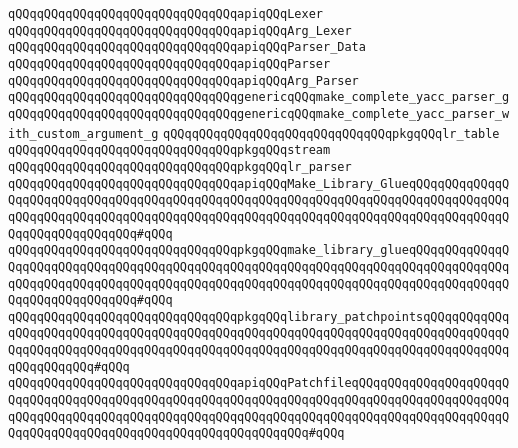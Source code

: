 \verb|qQQqqQQqqQQqqQQqqQQqqQQqqQQqqQQqapiqQQqLexer|\newline
\verb|qQQqqQQqqQQqqQQqqQQqqQQqqQQqqQQqapiqQQqArg_Lexer|\newline
\verb|qQQqqQQqqQQqqQQqqQQqqQQqqQQqqQQqapiqQQqParser_Data|\newline
\verb|qQQqqQQqqQQqqQQqqQQqqQQqqQQqqQQqapiqQQqParser|\newline
\verb|qQQqqQQqqQQqqQQqqQQqqQQqqQQqqQQqapiqQQqArg_Parser|\newline
\newline
\verb|qQQqqQQqqQQqqQQqqQQqqQQqqQQqqQQqgenericqQQqmake_complete_yacc_parser_g|\newline
\verb|qQQqqQQqqQQqqQQqqQQqqQQqqQQqqQQqgenericqQQqmake_complete_yacc_parser_with_custom_argument_g|\newline
\newline
\verb|qQQqqQQqqQQqqQQqqQQqqQQqqQQqqQQqpkgqQQqlr_table|\newline
\verb|qQQqqQQqqQQqqQQqqQQqqQQqqQQqqQQqpkgqQQqstream|\newline
\verb|qQQqqQQqqQQqqQQqqQQqqQQqqQQqqQQqpkgqQQqlr_parser|\newline
\newline
\verb|qQQqqQQqqQQqqQQqqQQqqQQqqQQqqQQqapiqQQqMake_Library_GlueqQQqqQQqqQQqqQQqqQQqqQQqqQQqqQQqqQQqqQQqqQQqqQQqqQQqqQQqqQQqqQQqqQQqqQQqqQQqqQQqqQQqqQQqqQQqqQQqqQQqqQQqqQQqqQQqqQQqqQQqqQQqqQQqqQQqqQQqqQQqqQQqqQQqqQQqqQQqqQQqqQQqqQQqqQQq#qQQq|\newline
\verb|qQQqqQQqqQQqqQQqqQQqqQQqqQQqqQQqpkgqQQqmake_library_glueqQQqqQQqqQQqqQQqqQQqqQQqqQQqqQQqqQQqqQQqqQQqqQQqqQQqqQQqqQQqqQQqqQQqqQQqqQQqqQQqqQQqqQQqqQQqqQQqqQQqqQQqqQQqqQQqqQQqqQQqqQQqqQQqqQQqqQQqqQQqqQQqqQQqqQQqqQQqqQQqqQQqqQQqqQQq#qQQq|\newline
\newline
\verb|qQQqqQQqqQQqqQQqqQQqqQQqqQQqqQQqpkgqQQqlibrary_patchpointsqQQqqQQqqQQqqQQqqQQqqQQqqQQqqQQqqQQqqQQqqQQqqQQqqQQqqQQqqQQqqQQqqQQqqQQqqQQqqQQqqQQqqQQqqQQqqQQqqQQqqQQqqQQqqQQqqQQqqQQqqQQqqQQqqQQqqQQqqQQqqQQqqQQqqQQqqQQqqQQqqQQq#qQQq|\newline
\newline
\verb|qQQqqQQqqQQqqQQqqQQqqQQqqQQqqQQqapiqQQqPatchfileqQQqqQQqqQQqqQQqqQQqqQQqqQQqqQQqqQQqqQQqqQQqqQQqqQQqqQQqqQQqqQQqqQQqqQQqqQQqqQQqqQQqqQQqqQQqqQQqqQQqqQQqqQQqqQQqqQQqqQQqqQQqqQQqqQQqqQQqqQQqqQQqqQQqqQQqqQQqqQQqqQQqqQQqqQQqqQQqqQQqqQQqqQQqqQQqqQQqqQQqqQQq#qQQq|\newline
